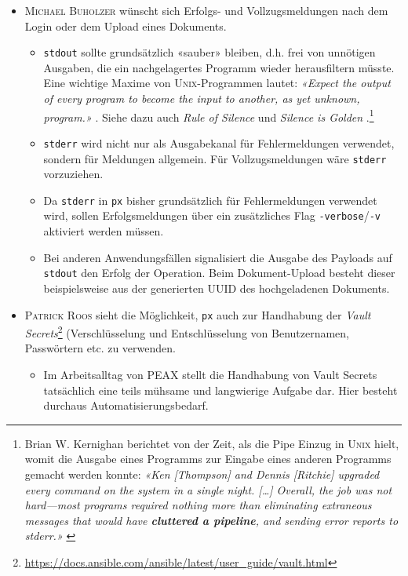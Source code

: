 \begin{itemize}
    \item \textsc{Michael Buholzer} wünscht sich Erfolgs- und Vollzugsmeldungen nach dem Login oder dem Upload eines Dokuments.
    \begin{itemize}
        \item \texttt{stdout} sollte grundsätzlich «sauber» bleiben, d.h. frei von unnötigen Ausgaben, die ein nachgelagertes Programm wieder herausfiltern müsste. Eine wichtige Maxime von \textsc{Unix}-Programmen lautet: \textit{«Expect the output of every program to become the input to another, as yet unknown, program.»} \cite[p. 3]{unixtimesharing}. Siehe dazu auch \textit{Rule of Silence} \cite[p. 20]{unixart} und \textit{Silence is Golden} \cite[p. 111]{unixphil}.\footnote{Brian W. Kernighan berichtet von der Zeit, als die Pipe Einzug in \textsc{Unix} hielt, womit die Ausgabe eines Programms zur Eingabe eines anderen Programms gemacht werden konnte: \textit{«Ken [Thompson] and Dennis [Ritchie] upgraded every command on the system in a single night. […] Overall, the job was not hard—most programs required nothing more than eliminating extraneous messages that would have \textbf{cluttered a pipeline}, and sending error reports to stderr.»} \cite[p. 69]{unix-history-memoir}}
        \item \texttt{stderr} wird nicht nur als Ausgabekanal für Fehlermeldungen verwendet, sondern für Meldungen allgemein. Für Vollzugsmeldungen wäre \texttt{stderr} vorzuziehen.
        \item Da \texttt{stderr} in \texttt{px} bisher grundsätzlich für Fehlermeldungen verwendet wird, sollen Erfolgsmeldungen über ein zusätzliches Flag \texttt{-verbose}/\texttt{-v} aktiviert werden müssen.
        \item Bei anderen Anwendungsfällen signalisiert die Ausgabe des Payloads auf \texttt{stdout} den Erfolg der Operation. Beim Dokument-Upload besteht dieser beispielsweise aus der generierten UUID des hochgeladenen Dokuments.
    \end{itemize}
\item \textsc{Patrick Roos} sieht die Möglichkeit, \texttt{px} auch zur Handhabung der \textit{Vault Secrets}\footnote{\url{https://docs.ansible.com/ansible/latest/user_guide/vault.html}} (Verschlüsselung und Entschlüsselung von Benutzernamen, Passwörtern etc. zu verwenden.
    \begin{itemize}
        \item Im Arbeitsalltag von PEAX stellt die Handhabung von Vault Secrets tatsächlich eine teils mühsame und langwierige Aufgabe dar. Hier besteht durchaus Automatisierungsbedarf.

\end{itemize}
\end{itemize}
